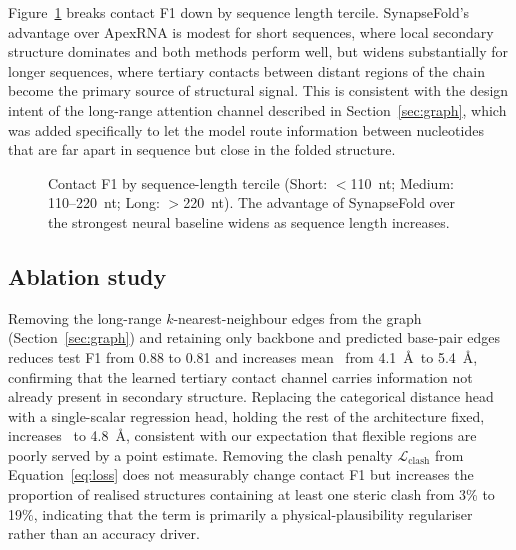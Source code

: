 Figure~\ref{fig:f1length} breaks contact F1 down by sequence length tercile. SynapseFold's advantage over ApexRNA is modest for short sequences, where local secondary structure dominates and both methods perform well, but widens substantially for longer sequences, where tertiary contacts between distant regions of the chain become the primary source of structural signal. This is consistent with the design intent of the long-range attention channel described in Section~\ref{sec:graph}, which was added specifically to let the model route information between nucleotides that are far apart in sequence but close in the folded structure.

\begin{figure}[t]
\centering
{}
\caption{Contact F1 by sequence-length tercile (Short: $<$110~nt; Medium: 110--220~nt; Long: $>$220~nt). The advantage of SynapseFold over the strongest neural baseline widens as sequence length increases.}
\label{fig:f1length}
\end{figure}

\subsection{Ablation study}
\label{sec:ablation}

Removing the long-range $k$-nearest-neighbour edges from the graph (Section~\ref{sec:graph}) and retaining only backbone and predicted base-pair edges reduces test F1 from 0.88 to 0.81 and increases mean \rmsd\ from 4.1~\AA\ to 5.4~\AA, confirming that the learned tertiary contact channel carries information not already present in secondary structure. Replacing the categorical distance head with a single-scalar regression head, holding the rest of the architecture fixed, increases \rmsd\ to 4.8~\AA, consistent with our expectation that flexible regions are poorly served by a point estimate. Removing the clash penalty $\mathcal{L}_{\mathrm{clash}}$ from Equation~\eqref{eq:loss} does not measurably change contact F1 but increases the proportion of realised structures containing at least one steric clash from 3\% to 19\%, indicating that the term is primarily a physical-plausibility regulariser rather than an accuracy driver.
